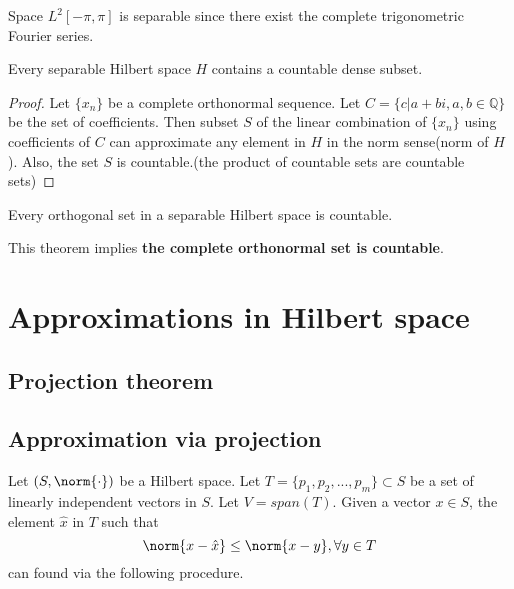 \begin{refsection}
\begin{example}
\cite[127]{debnath2005hilbert}Space $L^2[-\pi,\pi]$ is separable since there exist the complete trigonometric Fourier series.
\end{example}


\begin{theorem}
\cite[128]{debnath2005hilbert} Every separable Hilbert space $H$ contains a countable dense subset.
\end{theorem}
\begin{proof}
Let $\{x_n\}$ be a complete orthonormal sequence. Let $C = \{c|a+bi,a,b\in \mathbb{Q}\}$ be the set of coefficients. Then subset $S$ of the linear combination of $\{x_n\}$ using coefficients of $C$ can approximate any element in $H$ in the norm sense(norm of $H$). Also, the set $S$ is countable.(the product of countable sets are countable sets) 
\end{proof}

\begin{theorem}
\cite[128]{debnath2005hilbert}Every orthogonal set in a separable Hilbert space is countable.
\end{theorem}


\begin{remark}
This theorem implies \textbf{the complete orthonormal set is countable}.
\end{remark}



\section{Approximations in Hilbert space}
\subsection{Projection theorem }


\subsection{Approximation via projection}
\begin{theorem}\label{ch:functional-analysis:th:HilbertSpaceSubspaceApproximationTheorem}
Let $(S,\norm{\cdot})$ be a Hilbert space. Let $T=\{p_1,p_2,...,p_m\} \subset S$ be a set of linearly independent vectors in $S$. Let $V=span(T)$. 
	Given a vector $x\in S$, the element $\hat{x}$ in $T$ such that 
	$$\norm{x-\hat{x}}\leq \norm{x-y}, \forall y
	\in T$$
	can found via the following procedure. 
	

\end{theorem}
\end{refsection}
